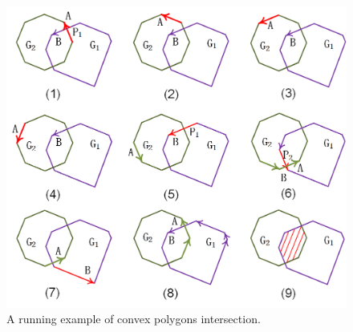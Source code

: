 \begin{figure}[tb!]
\centering
\includegraphics[scale=0.88]{figures/Fig-convex-poly-inter.png}
\vspace{-2ex}
\caption{\small A running example of convex polygons intersection.}
\vspace{-1ex}
\label{fig:c-poly-inter}
\end{figure}



